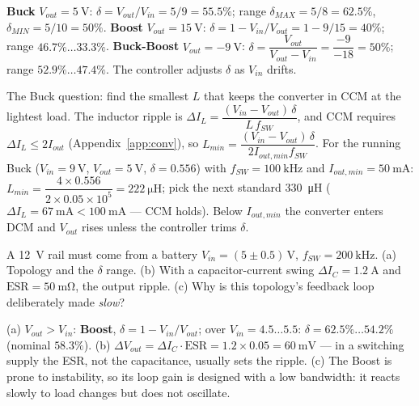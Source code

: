 \documentclass[11pt,a4paper,oneside]{book}
\begin{document}
\begin{wexample}[$V_{in}=\qty{9}{\volt}\pm\qty{1}{\volt}$, three targets]
\textbf{Buck} $V_{out}=\qty{5}{\volt}$: $\delta=V_{out}/V_{in}=5/9=55.5\%$;
range $\delta_{MAX}=5/8=62.5\%$, $\delta_{MIN}=5/10=50\%$.
\textbf{Boost} $V_{out}=\qty{15}{\volt}$: $\delta=1-V_{in}/V_{out}=1-9/15=40\%$;
range $46.7\%\dots33.3\%$.
\textbf{Buck-Boost} $V_{out}=\qty{-9}{\volt}$:
$\delta=\dfrac{V_{out}}{V_{out}-V_{in}}=\dfrac{-9}{-18}=50\%$;
range $52.9\%\dots47.4\%$. The controller adjusts $\delta$ as $V_{in}$ drifts.
\end{wexample}

\begin{wexample}
The Buck question: find the smallest $L$ that keeps the
converter in CCM at the lightest load. The inductor ripple is
$\Delta I_L=\dfrac{(V_{in}-V_{out})\,\delta}{L\,f_{SW}}$, and CCM requires
$\Delta I_L\le2I_{out}$ (Appendix~\ref{app:conv}), so
$L_{min}=\dfrac{(V_{in}-V_{out})\,\delta}{2I_{out,min}f_{SW}}$. For the running
Buck ($V_{in}=\qty{9}{\volt}$, $V_{out}=\qty{5}{\volt}$, $\delta=0.556$) with
$f_{SW}=\qty{100}{\kilo\hertz}$ and $I_{out,min}=\qty{50}{\milli\ampere}$:
$L_{min}=\dfrac{4\times0.556}{2\times0.05\times10^5}=\qty{222}{\micro\henry}$;
pick the next standard \qty{330}{\micro\henry}
($\Delta I_L=\qty{67}{\milli\ampere}<\qty{100}{\milli\ampere}$ --- CCM holds).
Below $I_{out,min}$ the converter enters DCM and $V_{out}$ rises unless the
controller trims $\delta$.
\end{wexample}

\begin{exercise}
A \qty{12}{\volt} rail must come from a battery $V_{in}=(5\pm0.5)\,\unit{\volt}$,
$f_{SW}=\qty{200}{\kilo\hertz}$. (a) Topology and the $\delta$ range. (b) With a
capacitor-current swing $\Delta I_C=\qty{1.2}{\ampere}$ and
$\text{ESR}=\qty{50}{\milli\ohm}$, the output ripple. (c) Why is this
topology's feedback loop deliberately made \emph{slow}?
\end{exercise}
\begin{solution}
(a) $V_{out}>V_{in}$: \textbf{Boost}, $\delta=1-V_{in}/V_{out}$; over
$V_{in}=4.5\dots5.5$: $\delta=62.5\%\dots54.2\%$ (nominal $58.3\%$).
(b) $\Delta V_{out}=\Delta I_C\cdot\text{ESR}=1.2\times0.05=\qty{60}{\milli\volt}$
--- in a switching supply the ESR, not the capacitance, usually sets the ripple.
(c) The Boost is prone to instability, so its loop gain is designed with a low
bandwidth: it reacts slowly to load changes but does not oscillate.
\end{solution}
\end{document}
